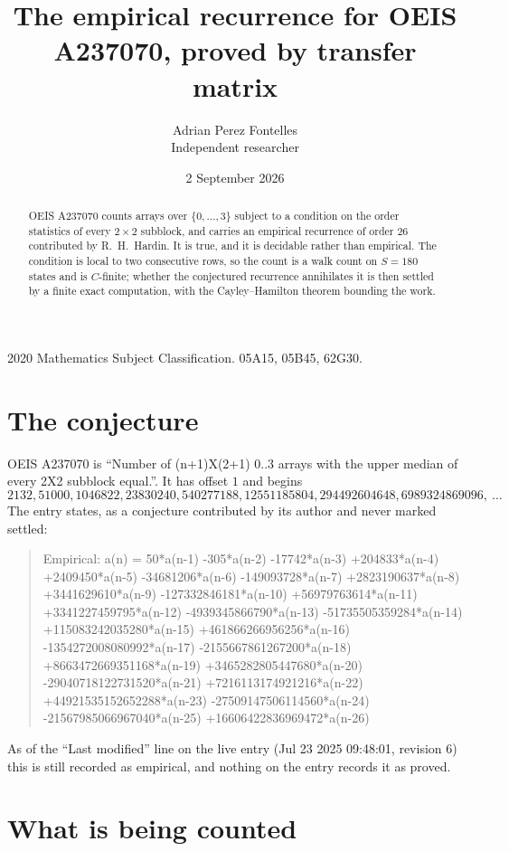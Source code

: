 \documentclass[11pt,a4paper]{article}
\title{The empirical recurrence for OEIS A237070, proved by transfer matrix}
\author{Adrian Perez Fontelles\\ \small Independent researcher}
\date{2 September 2026}
\theoremstyle{plain}
\theoremstyle{definition}
\begin{document}
\maketitle

\begin{abstract}
OEIS A237070 counts arrays over $\{0,\dots,3\}$ subject to a condition on the order
statistics of every $2\times2$ subblock, and carries an empirical recurrence of order
$26$ contributed by R.~H.~Hardin. It is true, and it is decidable rather than empirical.
The condition is local to two consecutive rows, so the count is a walk count on $S=180$
states and is $C$-finite; whether the conjectured recurrence annihilates it is then settled by
a finite exact computation, with the Cayley--Hamilton theorem bounding the work.
\end{abstract}

\noindent\small 2020 Mathematics Subject Classification. 05A15, 05B45, 62G30.\normalsize

\section{The conjecture}

OEIS A237070 is ``Number of (n+1)X(2+1) 0..3 arrays with the upper median of every 2X2 subblock equal.''. It has offset $1$ and begins
\[
2132, 51000, 1046822, 23830240, 540277188, 12551185804, 294492604648, 6989324869096,\ \dots
\]
The entry states, as a conjecture contributed by its author and never marked settled:
\begin{quote}
Empirical: a(n) = 50*a(n-1) -305*a(n-2) -17742*a(n-3) +204833*a(n-4) +2409450*a(n-5) -34681206*a(n-6) -149093728*a(n-7) +2823190637*a(n-8) +3441629610*a(n-9) -127332846181*a(n-10) +56979763614*a(n-11) +3341227459795*a(n-12) -4939345866790*a(n-13) -51735505359284*a(n-14) +115083242035280*a(n-15) +461866266956256*a(n-16) -1354272008080992*a(n-17) -2155667861267200*a(n-18) +8663472669351168*a(n-19) +3465282805447680*a(n-20) -29040718122731520*a(n-21) +7216113174921216*a(n-22) +44921535152652288*a(n-23) -27509147506114560*a(n-24) -21567985066967040*a(n-25) +16606422836969472*a(n-26)
\end{quote}
As of the ``Last modified'' line on the live entry (Jul 23 2025 09:48:01, revision 6) this is still
recorded as empirical, and nothing on the entry records it as proved.

\section{What is being counted}
\end{document}
